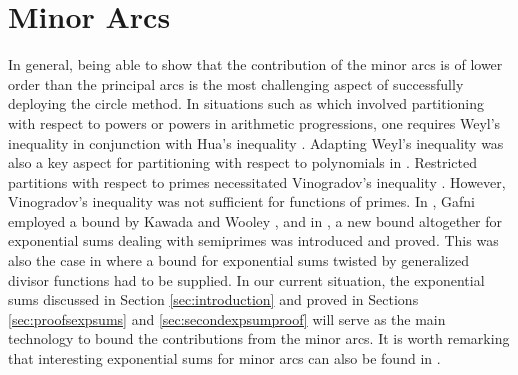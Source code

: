 \documentclass[11pt]{amsart}
\numberwithin{equation}{section}
\numberwithin{figure}{section}
\theoremstyle{definition}
\begin{document}
\section{Minor Arcs} \label{sec:minorarcs}
In general, being able to show that the contribution of the minor arcs is of lower order than the principal arcs is the most challenging aspect of successfully deploying the circle method. In situations such as \cite{bmz, gafnipowers} which involved partitioning with respect to powers or powers in arithmetic progressions, one requires Weyl's inequality \cite[Lemma 2.4]{V1997} in conjunction with Hua's inequality \cite[Theorem 4.1]{V1997}. Adapting Weyl's inequality was also a key aspect for partitioning with respect to polynomials in \cite{dunnrobles}. Restricted partitions with respect to primes \cite{vaughanprimes} necessitated Vinogradov's inequality \cite[Chapter 3]{V1997}. However, Vinogradov's inequality was not sufficient for functions of primes. In \cite{gafniprimepowers}, Gafni employed a bound by Kawada and Wooley \cite{kawadawooley}, and in \cite{drzz}, a new bound altogether for exponential sums dealing with semiprimes was introduced and proved. This was also the case in \cite[$\mathsection$6]{brzz} where a bound for exponential sums twisted by generalized divisor functions had to be supplied. In our current situation, the exponential sums discussed in Section \ref{sec:introduction} and proved in Sections \ref{sec:proofsexpsums} and \ref{sec:secondexpsumproof} will serve as the main technology to bound the contributions from the minor arcs. It is worth remarking that interesting exponential sums for minor arcs can also be found in \cite{kumchevalmostprimes}. \\
\end{document}
